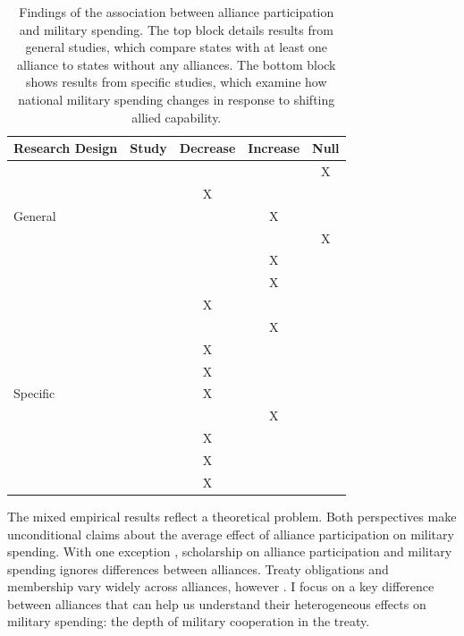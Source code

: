 \documentclass[12pt]{article}
\begin{document}
\begin{table}[hbt!]
\begin{center}
\begin{tabular}{lcccc}
   Research Design  & Study & Decrease & Increase & Null \\
\hline
\multirow{5}{*}{General} & \citet{MostSiverson1987} &  &  & X \\
 & \citet{Conybeare1994}    & X & &  \\
 & \citet{Diehl1994}        &  & X &  \\
 & \citet{Goldsmith2003}    &  &  & X \\
 & \citet{MorganPalmer2006} &  & X & \\ 
 & \citet{QuirozFlores2011} &  & X &  \\ 
 & \citet{OnealWhatley1996} & X &  & \\ 
 \hline
 \multirow{7}{*}{Specific} &\citet{ConybeareSandler1990} &   & X &  \\
 &\citet{BarnettLevy1991} & X  &  &  \\
 &\citet{Morrow1993}      & X  &  &  \\
 &\citet{Sorokin1994}     & X  &  &  \\
 &\citet{Chenetal1996}    &  & X &  \\
 &\citet{PluemperNeumayer2015} & X &  &  \\
 &\citet{GeorgeSandler2017} & X &  &  \\
 &\citet{OlsonZeckhauser1966} & X & & \\
\hline
\end{tabular}
\caption{Findings of the association between alliance participation and military spending. The top block details results from general studies, which compare states with at least one alliance to states without any alliances. The bottom block shows results from specific studies, which examine how national military spending changes in response to shifting allied capability.}
\label{tab:results-sum}
\end{center} 
\end{table}


The mixed empirical results reflect a theoretical problem. 
Both perspectives make unconditional claims about the average effect of alliance participation on military spending.  
With one exception \citep{DigiuseppePoast2016}, scholarship on alliance participation and military spending ignores differences between alliances.
Treaty obligations and membership vary widely across alliances, however \citep{Leedsetal2002}. 
I focus on a key difference between alliances that can help us understand their heterogeneous effects on military spending: the depth of military cooperation in the treaty.
\end{document}
